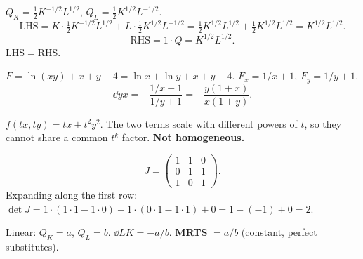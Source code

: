 \begin{solutions}
  \item $Q_{K}=\tfrac12 K^{-1/2}L^{1/2}$,
        $Q_{L}=\tfrac12 K^{1/2}L^{-1/2}$.
        \[
          \mathrm{LHS}=K\cdot\tfrac12 K^{-1/2}L^{1/2}
          +L\cdot\tfrac12 K^{1/2}L^{-1/2}
          =\tfrac12 K^{1/2}L^{1/2}+\tfrac12 K^{1/2}L^{1/2}
          =K^{1/2}L^{1/2} .
        \]
        \[
          \mathrm{RHS}=1\cdot Q=K^{1/2}L^{1/2} .
        \]
        $\mathrm{LHS}=\mathrm{RHS}$. \checkmark

  \item $F=\ln(xy)+x+y-4=\ln x+\ln y+x+y-4$. $F_{x}=1/x+1$,
        $F_{y}=1/y+1$.
        \[
          \dd{y}{x}=-\frac{1/x+1}{1/y+1}=-\frac{y(1+x)}{x(1+y)} .
        \]

  \item $f(tx,ty)=tx+t^{2}y^{2}$. The two terms scale with different
        powers of $t$, so they cannot share a common $t^{k}$ factor.
        \textbf{Not homogeneous.}

  \item
        \[
          J=\begin{pmatrix}
            1 & 1 & 0\\
            0 & 1 & 1\\
            1 & 0 & 1
          \end{pmatrix} .
        \]
        Expanding along the first row:
        $\det J=1\cdot(1\cdot 1-1\cdot 0)-1\cdot(0\cdot 1-1\cdot 1)+0
        =1-(-1)+0=2$.

  \item Linear: $Q_{K}=a$, $Q_{L}=b$. $\dd{L}{K}=-a/b$. \textbf{MRTS}
        $=a/b$ (constant, perfect substitutes).


\end{solutions}
